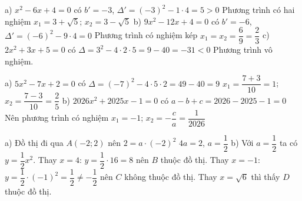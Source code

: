 \begin{problem}[9DS-PT2-003]
a) $x^2 - 6x + 4 = 0$ có $b' = -3$, $\Delta' = (-3)^2 - 1 \cdot 4 = 5 > 0$
Phương trình có hai nghiệm $x_1 = 3 + \sqrt{5}$; $x_2 = 3 - \sqrt{5}$
b) $9x^2 - 12x + 4 = 0$ có $b' = -6$, $\Delta' = (-6)^2 - 9 \cdot 4 = 0$
Phương trình có nghiệm kép $x_1 = x_2 = \dfrac{6}{9} = \dfrac{2}{3}$
c) $2x^2 + 3x + 5 = 0$ có $\Delta = 3^2 - 4 \cdot 2 \cdot 5 = 9 - 40 = -31 < 0$
Phương trình vô nghiệm.
\end{problem}

\begin{problem}[9DS-PT2-004]
a) $5x^2 - 7x + 2 = 0$ có $\Delta = (-7)^2 - 4 \cdot 5 \cdot 2 = 49 - 40 = 9$
$x_1 = \dfrac{7 + 3}{10} = 1$; $x_2 = \dfrac{7 - 3}{10} = \dfrac{2}{5}$
b) $2026x^2 + 2025x - 1 = 0$ có $a - b + c = 2026 - 2025 - 1 = 0$
Nên phương trình có nghiệm $x_1 = -1$; $x_2 = -\dfrac{c}{a} = \dfrac{1}{2026}$
\end{problem}

\begin{problem}[9DS-HSB2-002]
a) Đồ thị đi qua $A(-2; 2)$ nên $2 = a \cdot (-2)^2$
$4a = 2$, $a = \dfrac{1}{2}$
b) Với $a = \dfrac{1}{2}$ ta có $y = \dfrac{1}{2}x^2$.
Thay $x = 4$: $y = \dfrac{1}{2} \cdot 16 = 8$ nên $B$ thuộc đồ thị.
Thay $x = -1$: $y = \dfrac{1}{2} \cdot (-1)^2 = \dfrac{1}{2} \neq -\dfrac{1}{2}$ nên $C$ không thuộc đồ thị.
Thay $x = \sqrt{6}$ thì thấy $D$ thuộc đồ thị.
\end{problem}
